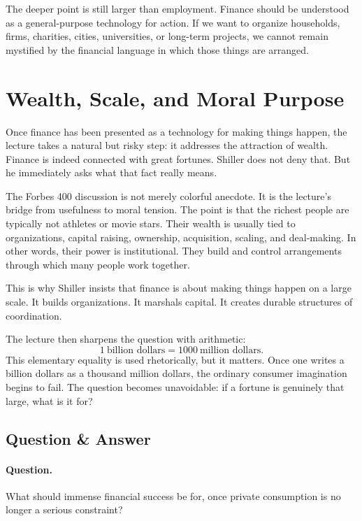 The deeper point is still larger than employment. Finance should be understood as a general-purpose technology for action. If we want to organize households, firms, charities, cities, universities, or long-term projects, we cannot remain mystified by the financial language in which those things are arranged.

\section{Wealth, Scale, and Moral Purpose}

Once finance has been presented as a technology for making things happen, the lecture takes a natural but risky step: it addresses the attraction of wealth. Finance is indeed connected with great fortunes. Shiller does not deny that. But he immediately asks what that fact really means.

The Forbes 400 discussion is not merely colorful anecdote. It is the lecture's bridge from usefulness to moral tension. The point is that the richest people are typically not athletes or movie stars. Their wealth is usually tied to organizations, capital raising, ownership, acquisition, scaling, and deal-making. In other words, their power is institutional. They build and control arrangements through which many people work together.

This is why Shiller insists that finance is about making things happen on a large scale. It builds organizations. It marshals capital. It creates durable structures of coordination.

The lecture then sharpens the question with arithmetic:
\begin{equation}
1\ \text{billion dollars}=1000\ \text{million dollars}.
\end{equation}
This elementary equality is used rhetorically, but it matters. Once one writes a billion dollars as a thousand million dollars, the ordinary consumer imagination begins to fail. The question becomes unavoidable: if a fortune is genuinely that large, what is it for?

\subsection{Question \& Answer}

\paragraph{Question.}
What should immense financial success be for, once private consumption is no longer a serious constraint?

